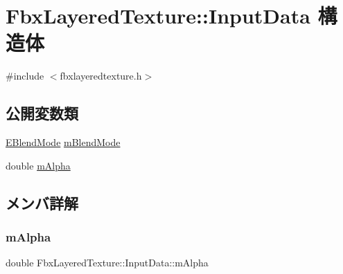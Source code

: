 \hypertarget{struct_fbx_layered_texture_1_1_input_data}{}\section{Fbx\+Layered\+Texture\+:\+:Input\+Data 構造体}
\label{struct_fbx_layered_texture_1_1_input_data}


{\ttfamily \#include $<$fbxlayeredtexture.\+h$>$}

\subsection*{公開変数類}
\begin{DoxyCompactItemize}
\item 
\hyperlink{class_fbx_layered_texture_af291d42b0329513909d2ddf48f56f5ba}{E\+Blend\+Mode} \hyperlink{struct_fbx_layered_texture_1_1_input_data_abc788f95c5595020e3d8989ee3d02a2b}{m\+Blend\+Mode}
\item 
double \hyperlink{struct_fbx_layered_texture_1_1_input_data_a537e5070bf114a808f72fe15a2baab66}{m\+Alpha}
\end{DoxyCompactItemize}


\subsection{メンバ詳解}
\mbox{\label{struct_fbx_layered_texture_1_1_input_data_a537e5070bf114a808f72fe15a2baab66}} 
\subsubsection{\texorpdfstring{m\+Alpha}{mAlpha}}
{\footnotesize\ttfamily double Fbx\+Layered\+Texture\+::\+Input\+Data\+::m\+Alpha}

\mbox{\label{struct_fbx_layered_texture_1_1_input_data_abc788f95c5595020e3d8989ee3d02a2b}} 
